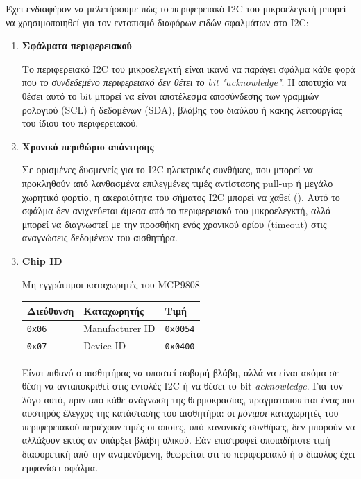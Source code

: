 \documentclass[a4paper,nobib]{tufte-book}
\begin{document}
Έχει ενδιαφέρον να μελετήσουμε πώς το περιφερειακό \ac{I2C} του μικροελεγκτή μπορεί να χρησιμοποιηθεί για τον εντοπισμό διαφόρων ειδών σφαλμάτων στο \ac{I2C}:

\begin{enumerate}
	\item \textbf{Σφάλματα περιφερειακού}
	
	Το περιφερειακό \ac{I2C} του μικροελεγκτή είναι ικανό να παράγει σφάλμα κάθε φορά που \emph{το συνδεδεμένο περιφερειακό δεν θέτει το bit "acknowledge"}. Η αποτυχία να θέσει αυτό το bit μπορεί να είναι αποτέλεσμα αποσύνδεσης των γραμμών ρολογιού (\acs{SCL}) ή δεδομένων (\acs{SDA}), βλάβης του διαύλου ή κακής λειτουργίας του ίδιου του περιφερειακού.
	
	\item \textbf{Χρονικό περιθώριο απάντησης}
	
	Σε ορισμένες δυσμενείς για το \ac{I2C} ηλεκτρικές συνθήκες, που μπορεί να προκληθούν από λανθασμένα επιλεγμένες τιμές αντίστασης pull-up ή μεγάλο χωρητικό φορτίο, η ακεραιότητα του σήματος \ac{I2C} μπορεί να χαθεί (). Αυτό το σφάλμα δεν ανιχνεύεται άμεσα από το περιφερειακό του μικροελεγκτή, αλλά μπορεί να διαγνωστεί με την προσθήκη ενός χρονικού ορίου (timeout) στις αναγνώσεις δεδομένων του αισθητήρα.
	
	\item \textbf{Chip ID}
	
	\begin{margintable}
		\centering
		\caption{Μη εγγράψιμοι καταχωρητές του MCP9808}
		\label{tab:mcp9808readonly}
		\begin{tabularx}{\linewidth}{@{}lXl@{}}
			\toprule
			Διεύθυνση & Καταχωρητής & Τιμή \\ \midrule
			\texttt{0x06} & Manufacturer ID & \texttt{0x0054} \\
			\texttt{0x07} & Device ID & \texttt{0x0400} \\ \bottomrule
		\end{tabularx}
	\end{margintable}

	Είναι πιθανό ο αισθητήρας να υποστεί σοβαρή βλάβη, αλλά να είναι ακόμα σε θέση να ανταποκριθεί στις εντολές \ac{I2C} ή να θέσει το bit \emph{acknowledge}. Για τον λόγο αυτό, πριν από κάθε ανάγνωση της θερμοκρασίας, πραγματοποιείται ένας πιο αυστηρός έλεγχος της κατάστασης του αισθητήρα: οι \emph{μόνιμοι} καταχωρητές του περιφερειακού περιέχουν τιμές οι οποίες, υπό κανονικές συνθήκες, δεν μπορούν να αλλάξουν εκτός αν υπάρξει βλάβη υλικού. Εάν επιστραφεί οποιαδήποτε τιμή διαφορετική από την αναμενόμενη, θεωρείται ότι το περιφερειακό ή ο δίαυλος έχει εμφανίσει σφάλμα.
\end{enumerate}
\end{document}

